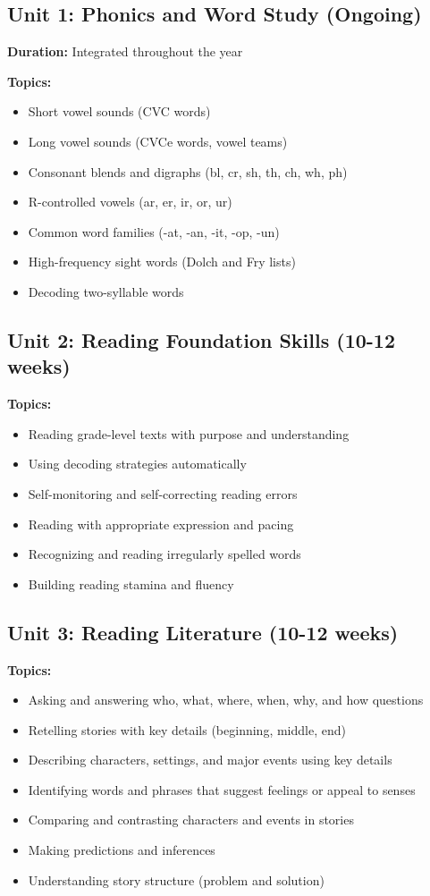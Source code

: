 \documentclass[11pt,letterpaper]{report}
\begin{document}
\subsection{Unit 1: Phonics and Word Study (Ongoing)}

\textbf{Duration:} Integrated throughout the year

\textbf{Topics:}
\begin{itemize}
    \item Short vowel sounds (CVC words)
    \item Long vowel sounds (CVCe words, vowel teams)
    \item Consonant blends and digraphs (bl, cr, sh, th, ch, wh, ph)
    \item R-controlled vowels (ar, er, ir, or, ur)
    \item Common word families (-at, -an, -it, -op, -un)
    \item High-frequency sight words (Dolch and Fry lists)
    \item Decoding two-syllable words
\end{itemize}

\subsection{Unit 2: Reading Foundation Skills (10-12 weeks)}

\textbf{Topics:}
\begin{itemize}
    \item Reading grade-level texts with purpose and understanding
    \item Using decoding strategies automatically
    \item Self-monitoring and self-correcting reading errors
    \item Reading with appropriate expression and pacing
    \item Recognizing and reading irregularly spelled words
    \item Building reading stamina and fluency
\end{itemize}

\subsection{Unit 3: Reading Literature (10-12 weeks)}

\textbf{Topics:}
\begin{itemize}
    \item Asking and answering who, what, where, when, why, and how questions
    \item Retelling stories with key details (beginning, middle, end)
    \item Describing characters, settings, and major events using key details
    \item Identifying words and phrases that suggest feelings or appeal to senses
    \item Comparing and contrasting characters and events in stories
    \item Making predictions and inferences
    \item Understanding story structure (problem and solution)
\end{itemize}
\end{document}

